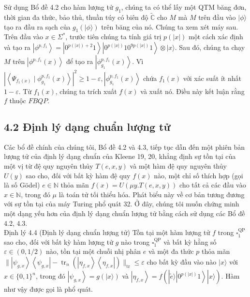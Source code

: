\documentclass[10pt]{article}
\begin{document}
Sử dụng Bổ đề 4.2 cho hàm lượng tử $g_{1}$, chúng ta có thể lấy một QTM băng đơn, thời gian đa thức, bảo thủ, thuần túy có biên độ $\tilde{\mathbb{C}}$ cho $M$ mà $M$ trên đầu vào $|\phi\rangle$ tạo ra đầu ra sạch của $g_{1}(|\phi\rangle)$ trên băng của nó. Chúng ta xem xét máy sau. Trên đầu vào $x \in \Sigma^{*}$, trước tiên chúng ta tính giá trị $p(|x|)$ một cách xác định và tạo ra $\left|\phi^{p, f_{1}}\right\rangle=\left|0^{p(|x|)+2} 1\right\rangle\left|0^{p(|x|)} 10^{9 p(|x|)} 1\right\rangle \otimes|x\rangle$. Sau đó, chúng ta chạy $M$ trên $\left|\phi^{p, f_{1}}(x)\right\rangle$ để tạo ra $\left|\phi_{g_{1}}^{p, f_{1}}(x)\right\rangle$. Vì $\left|\left\langle\Psi_{f_{1}(x)} \mid \phi_{g_{1}}^{p, f_{1}}(x)\right\rangle\right|^{2} \geq 1-\varepsilon,\left|\phi_{g_{1}}^{p, f_{1}}(x)\right\rangle$ chứa $f_{1}(x)$ với xác suất ít nhất $1-\varepsilon$. Từ $f_{1}(x)$, chúng ta trích xuất $f(x)$ và xuất nó. Điều này kết luận rằng $f$ thuộc $F B Q P$.

\subsection*{4.2 Định lý dạng chuẩn lượng tử}
Các bổ đề chính của chúng tôi, Bổ đề 4.2 và 4.3, tiếp tục dẫn đến một phiên bản lượng tử của định lý dạng chuẩn của Kleene 19, 20, khẳng định sự tồn tại của một vị từ đệ quy nguyên thủy $T(e, x, y)$ và một hàm đệ quy nguyên thủy $U(y)$ sao cho, đối với bất kỳ hàm đệ quy $f(x)$ nào, một chỉ số thích hợp (gọi là số Gödel) $e \in \mathbb{N}$ thỏa mãn $f(x)=U(\mu y . T(e, x, y))$ cho tất cả các đầu vào $x \in \mathbb{N}$, trong đó $\mu$ là toán tử tối thiểu hóa. Phát biểu này về cơ bản tương đương với sự tồn tại của máy Turing phổ quát 32. Ở đây, chúng tôi muốn chứng minh một dạng yếu hơn của định lý dạng chuẩn lượng tử bằng cách sử dụng các Bổ đề 4.2, 4.3.\\
Định lý 4.4 (Định lý dạng chuẩn lượng tử) Tồn tại một hàm lượng tử $f$ trong $\square_{1}^{\mathrm{QP}}$ sao cho, đối với bất kỳ hàm lượng tử $g$ nào trong $\square_{1}^{\mathrm{QP}}$ và bất kỳ hằng số $\varepsilon \in(0,1 / 2)$ nào, tồn tại một chuỗi nhị phân $e$ và một đa thức $p$ thỏa mãn $\|\left|\psi_{g, x}\right\rangle\left\langle\psi_{g, x}\right|-\operatorname{tr}_{n}\left(\left|\eta_{f, x}\right\rangle\left\langle\eta_{f, x}\right|\right) \|_{\mathrm{tr}} \leq \varepsilon$ cho bất kỳ đầu vào nào $|x\rangle$ với $x \in\{0,1\}^{n}$, trong đó $\left|\psi_{g, x}\right\rangle=g(|x\rangle)$ và $\left|\eta_{f, x}\right\rangle=f\left(|\tilde{e}\rangle\left|0^{p(|x|)} 1\right\rangle|x\rangle\right)$. Hàm như vậy được gọi là phổ quát.
\end{document}
